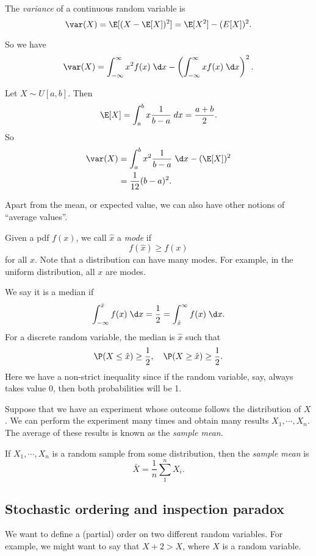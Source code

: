 \documentclass[a4paper]{article}
\begin{document}
\begin{defi}[Variance]
  The \emph{variance} of a continuous random variable is
  \[
    \var (X) = \E[(X - \E[X])^2] = \E[X^2] - (E[X])^2.
  \]
\end{defi}
So we have
\[
  \var (X) = \int_{-\infty}^\infty x^2 f(x) \;\d x - \left(\int_{-\infty}^\infty xf(x)\;\d x\right)^2.
\]
\begin{eg}
  Let $X\sim U[a, b]$. Then
  \[
    \E[X] = \int_a^b x\frac{1}{b - a}\;d x = \frac{a + b}{2}.
  \]
  So
  \begin{align*}
    \var (X) &= \int_a^b x^2\frac{1}{b - a}\;\d x - (\E[X])^2\\
    &= \frac{1}{12}(b - a)^2.
  \end{align*}
\end{eg}

Apart from the mean, or expected value, we can also have other notions of ``average values''.
\begin{defi}
  Given a pdf $f(x)$, we call $\hat x$ a \emph{mode} if
  \[
    f(\hat x) \geq f(x)
  \]
  for all $x$. Note that a distribution can have many modes. For example, in the uniform distribution, all $x$ are modes.

  We say it is a median if
  \[
    \int_{-\infty}^{\hat x}f(x)\;\d x = \frac{1}{2} = \int_{\hat x}^\infty f(x)\;\d x.
  \]
  For a discrete random variable, the median is $\hat x$ such that
  \[
    \P(X \leq \hat x) \geq \frac{1}{2}, \quad \P(X \geq \hat x) \geq \frac{1}{2}.
  \]
  Here we have a non-strict inequality since if the random variable, say, always takes value $0$, then both probabilities will be 1.
\end{defi}

Suppose that we have an experiment whose outcome follows the distribution of $X$. We can perform the experiment many times and obtain many results $X_1, \cdots, X_n$. The average of these results is known as the \emph{sample mean}.

\begin{defi}
  If $X_1, \cdots, X_n$ is a random sample from some distribution, then the \emph{sample mean} is
  \[
    \bar X = \frac{1}{n}\sum_1^n X_i.
  \]
\end{defi}

\subsection{Stochastic ordering and inspection paradox}
We want to define a (partial) order on two different random variables. For example, we might want to say that $X + 2 > X$, where $X$ is a random variable.
\end{document}
